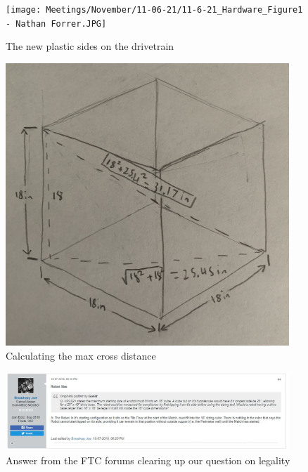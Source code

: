 \begin{figure}[ht]
\centering
\begin{minipage}[b]{.48\textwidth}
  \centering
  \texttt{[image: Meetings/November/11-06-21/11-6-21\_Hardware\_Figure1 - Nathan Forrer.JPG]}
  \caption{The new plastic sides on the drivetrain}
  \label{fig:110621_1}
\end{minipage}%
\hfill%
\begin{minipage}[b]{.48\textwidth}
  \centering
  \includegraphics[width=0.95\textwidth]{Meetings/November/11-06-21/11-6-21_Hardware_Figure2 - Nathan Forrer.JPG}
  \caption{Calculating the max cross distance}
  \label{fig:110621_2}
\end{minipage}
\end{figure}

\begin{figure}[htp]
\centering
  \includegraphics[width=0.95\textwidth]{Meetings/November/11-06-21/11-6-21_Hardware_Figure3 - Nathan Forrer.JPG}
  \caption{Answer from the FTC forums clearing up our question on legality}
  \label{fig:110621_3}
\end{figure}


